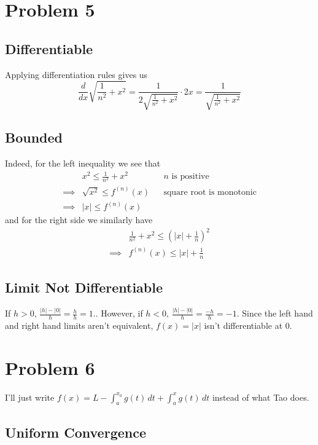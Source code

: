 \documentclass[12pt]{article}
\begin{document}
\pagebreak

\section{Problem 5}

\subsection{Differentiable}

Applying differentiation rules gives us
\[\frac{d}{dx} \sqrt{\frac{1}{n^2}+x^2}=\frac{1}{2\sqrt{\frac{1}{n^2}+x^2}} \cdot 2x=\boxed{\frac{1}{\sqrt{\frac{1}{n^2}+x^2}}}\]

\subsection{Bounded}

Indeed, for the left inequality we see that
\begin{align*}
    & x^2 \le \frac{1}{n^2}+x^2 && \text{$n$ is positive} \\
    \implies{} & \sqrt{x^2} \le f^{(n)}(x) && \text{square root is monotonic} \\
    \implies{} & |x| \le f^{(n)}(x)
\end{align*}
and for the right side we similarly have
\begin{align*}
    & \frac{1}{n^2}+x^2 \le \left(|x|+\frac{1}{n}\right)^2 \\
    \implies{} & f^{(n)}(x) \le |x|+\frac{1}{n}
\end{align*}

\subsection{Limit Not Differentiable}

If $h > 0$, $\frac{|h|-|0|}{h}=\frac{h}{h}=1$..
However, if $h < 0$, $\frac{|h|-|0|}{h}=\frac{-h}{h}=-1$.
Since the left hand and right hand limits aren't equivalent, $f(x)=|x|$ isn't differentiable at $0$.

\pagebreak

\section{Problem 6}

I'll just write $f(x)=L-\int_{a}^{x_0} g(t)\,dt+\int_{a}^{x} g(t)\,dt$ instead of what Tao does.

\subsection{Uniform Convergence}
\end{document}
